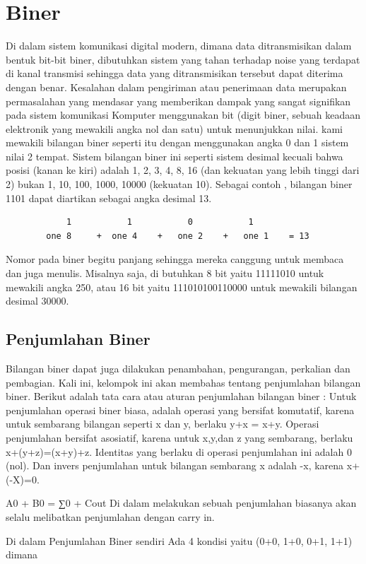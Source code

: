 \section {Biner}
	Di dalam sistem komunikasi digital modern, dimana data ditransmisikan dalam bentuk bit-bit biner, dibutuhkan sistem yang tahan terhadap noise yang terdapat di kanal transmisi sehingga data yang ditransmisikan tersebut dapat diterima dengan benar. Kesalahan dalam pengiriman atau penerimaan data merupakan permasalahan yang mendasar yang memberikan dampak yang sangat signifikan pada sistem komunikasi
	Komputer menggunakan bit (digit biner, sebuah keadaan elektronik yang mewakili angka nol dan satu) untuk menunjukkan nilai. kami mewakili bilangan biner seperti itu dengan menggunakan angka 0 dan 1 sistem nilai 2 tempat. Sistem bilangan biner ini seperti sistem desimal kecuali bahwa posisi (kanan ke kiri) adalah 1, 2, 3, 4, 8, 16 (dan kekuatan yang lebih tinggi dari 2) bukan 1, 10, 100, 1000, 10000 (kekuatan 10). Sebagai contoh , bilangan biner 1101 dapat diartikan sebagai angka desimal 13.
		\begin{verbatim}
			1			1			0			1
		one 8	  +	 one 4	  +	  one 2    +   one 1 	= 13
		\end{verbatim}
	Nomor pada  biner begitu panjang sehingga mereka canggung  untuk membaca dan juga menulis. Misalnya saja, di butuhkan 8 bit yaitu  11111010 untuk mewakili angka 250, atau 16 bit yaitu 111010100110000 untuk mewakili bilangan desimal 30000.


	\subsection {Penjumlahan Biner}
	Bilangan biner dapat juga dilakukan penambahan, pengurangan, perkalian dan pembagian. Kali ini, kelompok ini akan membahas tentang penjumlahan bilangan biner. Berikut adalah tata cara atau aturan penjumlahan bilangan biner :
	Untuk penjumlahan operasi biner biasa, adalah operasi yang bersifat komutatif, karena untuk sembarang bilangan seperti x dan y, berlaku y+x = x+y. Operasi penjumlahan bersifat asosiatif, karena untuk x,y,dan z yang sembarang, berlaku x+(y+z)=(x+y)+z. Identitas yang berlaku di operasi penjumlahan ini adalah 0 (nol). Dan invers penjumlahan untuk bilangan sembarang x adalah -x, karena x+(-X)=0.

	A0 + B0 = ∑0 + Cout
	Di dalam melakukan sebuah penjumlahan biasanya akan selalu melibatkan penjumlahan dengan carry in.

	Di dalam Penjumlahan Biner sendiri Ada 4 kondisi yaitu
	(0+0, 1+0, 0+1, 1+1) dimana

